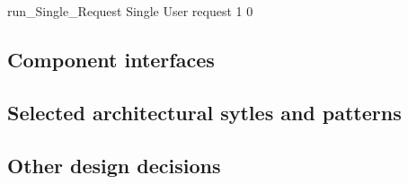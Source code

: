 \documentclass[../DD0.tex]{subfiles}
\begin{document}
    \fetchUML
      {run_Single_Request}
      {Single User request}
      {1}           %
      {0}           %

  \clearpage
  \subsection{Component interfaces}
  \label{sec:compinterf}

  \subsection{Selected architectural sytles and patterns}
  \label{sec:stylesandpatterns}

  \subsection{Other design decisions}
  \label{sec:designdecisions}
\end{document}
